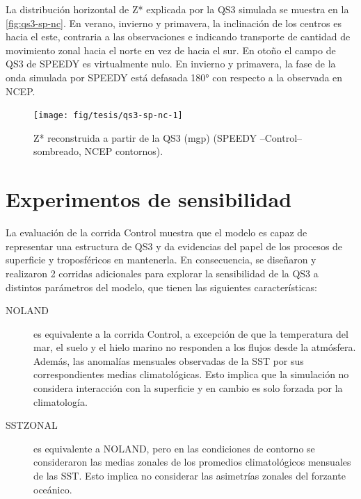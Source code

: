 \documentclass[spanish,a4paper,12pt,oneside]{book}
\begin{document}
La distribución horizontal de Z* explicada por la QS3 simulada se
muestra en la \autoref{fig:qs3-sp-nc}. En verano, invierno y primavera,
la inclinación de los centros es hacia el este, contraria a las
observaciones e indicando transporte de cantidad de movimiento zonal
hacia el norte en vez de hacia el sur. En otoño el campo de QS3 de
SPEEDY es virtualmente nulo. En invierno y primavera, la fase de la onda
simulada por SPEEDY está defasada 180° con respecto a la observada en
NCEP.

\begin{figure}
\texttt{[image: fig/tesis/qs3-sp-nc-1]} \caption{Z* reconstruida a partir de la QS3 (mgp) (SPEEDY --Control-- sombreado, NCEP contornos).}\label{fig:qs3-sp-nc}
\end{figure}

\hypertarget{experimentos-de-sensibilidad}{%
\section{Experimentos de
sensibilidad}\label{experimentos-de-sensibilidad}}

La evaluación de la corrida Control muestra que el modelo es capaz de
representar una estructura de QS3 y da evidencias del papel de los
procesos de superficie y troposféricos en mantenerla. En consecuencia,
se diseñaron y realizaron 2 corridas adicionales para explorar la
sensibilidad de la QS3 a distintos parámetros del modelo, que tienen las
siguientes características:

\begin{description}

\item[NOLAND]
es equivalente a la corrida Control, a excepción de que la temperatura del mar, el suelo y el hielo marino no responden a los flujos desde la atmósfera. Además, las anomalías mensuales observadas de la SST por sus correspondientes medias climatológicas. Esto implica que la simulación no considera interacción con la superficie y en cambio es solo forzada por la climatología.

\item[SSTZONAL]

es equivalente a NOLAND, pero en las condiciones de contorno se consideraron las medias zonales de los promedios climatológicos mensuales de las SST. Esto implica no considerar las asimetrías zonales del forzante oceánico.

\end{description}
\end{document}
